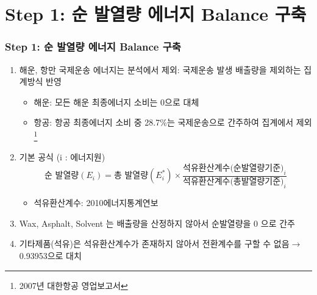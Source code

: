 \documentclass[10pt,compress,slidetop,%
			   hyperref={unicode},xcolor={svgnames},%
			   t]{beamer}
\begin{document}
\section{Step 1: 순 발열량 에너지 Balance 구축}
%
\begin{frame}
	\frametitle{Step 1: 순 발열량 에너지 Balance 구축}
	\begin{enumerate}
	\item{해운, 항만 국제운송 에너지는 분석에서 제외: 국제운송 발생 배출량을 제외하는 집계방식 반영}
		\begin{itemize}
		\item{해운: 모든 해운 최종에너지 소비는 0으로 대체}
		\item{항공: 항공 최종에너지 소비 중 28.7\%는 국제운송으로 간주하여 집계에서 제외\footnote{2007년 대한항공 영업보고서}} 
		\end{itemize}			
	\item{기본 공식 (i : 에너지원)}
	\begin{displaymath}
	\mbox{순 발열량} (E_i) =\mbox{총 발열량} (E^*_i) \times\frac{\mbox{석유환산계수(순발열량기준)}_i}{\mbox{석유환산계수(총발열량기준)}_i}
	\end{displaymath}
		\begin{itemize}
		\item{석유환산계수: 2010에너지통계연보}
		\end{itemize}
	\item{ Wax, Asphalt, Solvent 는 배출량을 산정하지 않아서 순발열량을 0 으로 간주}
	\item{ 기타제품(석유)은 석유환산계수가 존재하지 않아서 전환계수를 구할 수 없음$\rightarrow$ 0.93953으로 대치}
	\end{enumerate}
	
	
\end{frame}

%
\end{document}
